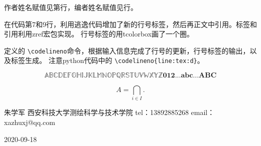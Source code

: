 \documentclass[UTF8]{ctexart}
\makeatletter
\newcounter{codelineno}
\renewcommand*{\thecodelineno}{\codelinenobox[blue]{\arabic{codelineno}}}
\newcommand*{\codelineno}[2][]{%
\edef\ref@temp{#1}%
\ifx\ref@temp\@empty\relax%
\stepcounter{codelineno}%
\else%
\setcounter{codelineno}{#1}%
\fi%
\makebox[0pt][c]{\hss\thecodelineno\hspace{10pt}}%
\zlabel{#2}%
}
\makeatother
\begin{document}
作者姓名赋值见第行，编者姓名赋值见行。

在代码第7和9行，利用逃逸代码增加了新的行号标签，然后再正文中引用。标签和引用利用zref宏包实现。
行号标签的用tcolorbox画了一个圈。

定义的 \verb|\codelineno|命令，根据输入信息完成了行号的更新，行号标签的输出，以及标签生成。
注意python代码中的 \verb|\codelineno{line:tex:d}|。

$$
\mathbb{ABCDEFGHIJKLMNOPQRSTUVWXYZ}
\mathbf{012...abc...ABC}
$$

\[
	A=\bigcap_{i \in I } 	
.\]

朱学军
西安科技大学测绘科学与技术学院
tel：13892885268
email：xazhuxj@qq.com

2020-09-18
\end{document}
